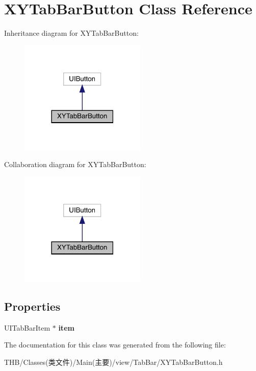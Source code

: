 \hypertarget{interface_x_y_tab_bar_button}{}\section{X\+Y\+Tab\+Bar\+Button Class Reference}
\label{interface_x_y_tab_bar_button}


Inheritance diagram for X\+Y\+Tab\+Bar\+Button\+:\nopagebreak
\begin{figure}[H]
\begin{center}
\leavevmode
\includegraphics[width=170pt]{interface_x_y_tab_bar_button__inherit__graph}
\end{center}
\end{figure}


Collaboration diagram for X\+Y\+Tab\+Bar\+Button\+:\nopagebreak
\begin{figure}[H]
\begin{center}
\leavevmode
\includegraphics[width=170pt]{interface_x_y_tab_bar_button__coll__graph}
\end{center}
\end{figure}
\subsection*{Properties}
\begin{DoxyCompactItemize}
\item 
\mbox{\label{interface_x_y_tab_bar_button_a43fb7a26666eb9a169552c22e1f9686e}} 
U\+I\+Tab\+Bar\+Item $\ast$ {\bfseries item}
\end{DoxyCompactItemize}


The documentation for this class was generated from the following file\+:\begin{DoxyCompactItemize}
\item 
T\+H\+B/\+Classes(类文件)/\+Main(主要)/view/\+Tab\+Bar/X\+Y\+Tab\+Bar\+Button.\+h\end{DoxyCompactItemize}
